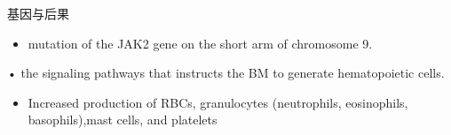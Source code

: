 \documentclass[
  ignorenonframetext,
]{beamer}
\providecommand{\tightlist}{%
  \setlength{\itemsep}{0pt}\setlength{\parskip}{0pt}}
\begin{document}
\begin{frame}
\begin{block}{基因与后果}
\protect\hypertarget{ux57faux56e0ux4e0eux540eux679c}{}
\begin{itemize}
\tightlist
\item
  mutation of the JAK2 gene on the short arm of chromosome 9.
\end{itemize}

• the signaling pathways that instructs the BM to generate hematopoietic
cells.

\begin{itemize}
\tightlist
\item
  Increased production of RBCs, granulocytes (neutrophils, eosinophils,
  basophils),mast cells, and platelets
\end{itemize}
\end{block}
\end{frame}
\end{document}
